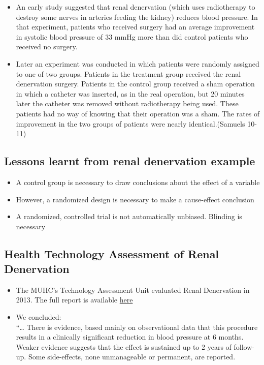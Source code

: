 \documentclass[
]{book}
\providecommand{\tightlist}{%
  \setlength{\itemsep}{0pt}\setlength{\parskip}{0pt}}
\begin{document}
\begin{itemize}
\tightlist
\item
  An early study suggested that renal denervation (which uses radiotherapy to destroy some nerves in arteries feeding the kidney) reduces blood pressure. In that experiment, patients who received surgery had an average improvement in systolic blood pressure of 33 mmHg more than did control patients who received no surgery.
\item
  Later an experiment was conducted in which patients were randomly assigned to one of two groups. Patients in the treatment group received the renal denervation surgery. Patients in the control group received a sham operation in which a catheter was inserted, as in the real operation, but 20 minutes later the catheter was removed without radiotherapy being used. These patients had no way of knowing that their operation was a sham. The rates of improvement in the two groups of patients were nearly identical.(Samuels 10-11)
\end{itemize}

\hypertarget{lessons-learnt-from-renal-denervation-example}{%
\subsection{Lessons learnt from renal denervation example}\label{lessons-learnt-from-renal-denervation-example}}

\begin{itemize}
\tightlist
\item
  A control group is necessary to draw conclusions about the effect of a variable
\item
  However, a randomized design is necessary to make a cause-effect conclusion
\item
  A randomized, controlled trial is not automatically unbiased. Blinding is necessary
\end{itemize}

\hypertarget{health-technology-assessment-of-renal-denervation}{%
\subsection{Health Technology Assessment of Renal Denervation}\label{health-technology-assessment-of-renal-denervation}}

\begin{itemize}
\tightlist
\item
  The MUHC's Technology Assessment Unit evaluated Renal Denervation in 2013. The full report is available \href{https://www.mcgill.ca/tau/files/tau/muhc_tau_2013_72_renald.pdf}{here}
\item
  We concluded:\\
  ``\ldots{} There is evidence, based mainly on observational data that this procedure results in a clinically significant reduction in blood pressure at 6 months. Weaker evidence suggests that the effect is sustained up to 2 years of follow-up. Some side-effects, none unmanageable or permanent, are reported.
\end{itemize}
\end{document}
